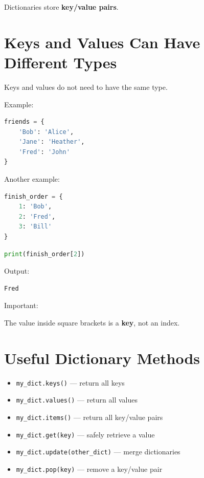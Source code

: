 \documentclass[11pt]{article}
\begin{document}
Dictionaries store \textbf{key/value pairs}.

\section{Keys and Values Can Have Different Types}

Keys and values do not need to have the same type.

Example:

\begin{lstlisting}[language=Python]
friends = {
    'Bob': 'Alice',
    'Jane': 'Heather',
    'Fred': 'John'
}
\end{lstlisting}

Another example:

\begin{lstlisting}[language=Python]
finish_order = {
    1: 'Bob',
    2: 'Fred',
    3: 'Bill'
}
\end{lstlisting}

\begin{lstlisting}[language=Python]
print(finish_order[2])
\end{lstlisting}

Output:

\begin{lstlisting}
Fred
\end{lstlisting}

Important:

The value inside square brackets is a \textbf{key}, not an index.

\section{Useful Dictionary Methods}

\begin{itemize}
    \item \verb|my_dict.keys()| --- return all keys

    \item \verb|my_dict.values()| --- return all values

    \item \verb|my_dict.items()| --- return all key/value pairs

    \item \verb|my_dict.get(key)| --- safely retrieve a value

    \item \verb|my_dict.update(other_dict)| --- merge dictionaries

    \item \verb|my_dict.pop(key)| --- remove a key/value pair
\end{itemize}
\end{document}
